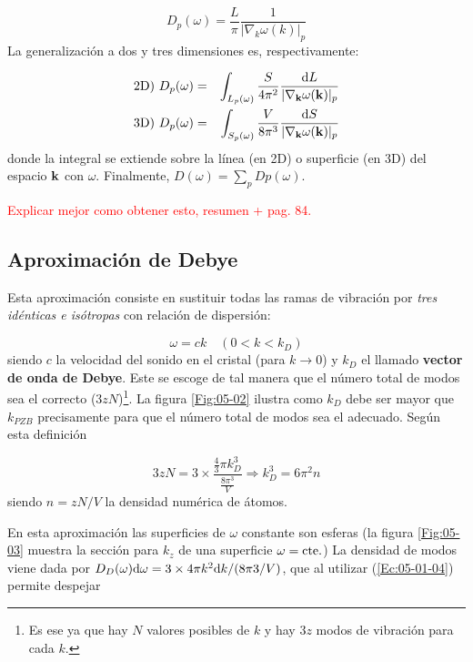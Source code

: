 \begin{equation}
	D_p (\omega)  = \frac{L}{\pi} \frac{1}{|\nabla_ k \omega (k)|_p }
\end{equation}
La generalización a dos y tres dimensiones es, respectivamente:

\begin{eqnarray}
	\text{2D}) \  D_p (\omega) &=& \int_{L_p (\omega)} \frac{S}{4\pi^2} \frac{\mathrm{d} L}{|\nabla_{\mathbf{k}} \omega(\mathbf{k})|_p} \\ 
	\text{3D}) \  D_p (\omega) &=& \int_{S_p (\omega)} \frac{V}{8\pi^3} \frac{\mathrm{d} S}{|\nabla_{\mathbf{k}} \omega(\mathbf{k})|_p} \label{Ec:05-01-04}
\end{eqnarray}
donde la integral se extiende sobre la línea (en 2D) o superficie (en 3D) del espacio $\mathbf{k}$ con $\omega$. Finalmente, $D(\omega)=\sum_p Dp (\omega)$.
 
 \begin{Anotacion}
 	\textcolor{red}{Explicar mejor como obtener esto, resumen + pag. 84.}
 \end{Anotacion}
 
 
\subsection{Aproximación de Debye}    

Esta aproximación consiste en sustituir todas las ramas de vibración por \textit{tres idénticas e isótropas} con relación de dispersión:

\begin{equation}
	\omega = c k \quad (0<k<k_D)
\end{equation}
siendo $c$ la velocidad del sonido en el cristal (para $k\rightarrow 0$) y $k_D$ el llamado \textbf{vector de onda de Debye}. Este se escoge de tal manera que el número total de modos sea el correcto ($3zN$)\footnote{Es ese ya que hay $N$ valores posibles de $k$ y hay $3z$ modos de vibración para cada $k$.}. La figura \ref{Fig:05-02} ilustra como $k_D$ debe ser mayor que $k_{PZB}$ precisamente para que el número total de modos sea el adecuado. Según esta definición

\begin{equation}
	3zN = 3 \times \frac{\frac{4}{3} \pi k^3_D}{\frac{8 \pi^3}{V}} \Rightarrow k_D^3 = 6 \pi^2 n
\end{equation}
siendo $n=zN/V$ la densidad numérica de átomos. 

En esta aproximación las superficies de $\omega$ constante son esferas (la figura \ref{Fig:05-03} muestra la sección para $k_z$ de una superficie $\omega=\text{cte}.$) La densidad de modos viene dada por $D_D(\omega) \mathrm{d} \omega = 3 \times 4 \pi k^2 \mathrm{d} k / (8\pi3 /V)$, que al utilizar (\ref{Ec:05-01-04}) permite despejar 

